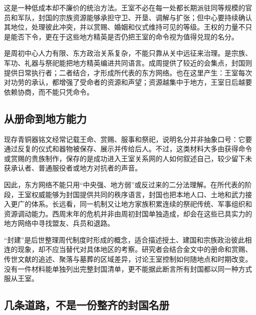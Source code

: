 这是一种低成本却不廉价的统治方法。王室不必在每一处都长期派驻同等规模的官员和军队，封国的宗族资源能够承担守卫、开垦、调解与扩张；但中心要持续确认其地位，处理彼此冲突，并以赏赐、婚姻和仪式维持可见的等级。王权的力量不只是能否下令，更在于这些地方精英是否仍把王室的命令视为值得兑现的名分。

\begin{causalchain}[从东方据点到关系网络]
是周初中心人力有限、东方政治关系复杂，不能只靠从关中远征来治理。是宗族、军功、礼器与祭祀能把地方精英编进共同语言。成周提供了较近的会集点，封国则提供日常执行者；二者结合，才形成所代表的东方网络。也在这里产生：王室每次对功劳的承认，都增强了受命者的资源和声望；资源越集中于地方，王室日后越要依赖协商，而不能只凭命令。
\end{causalchain}

\subsection{从册命到地方能力}

现存青铜器铭文经常记载王命、赏赐、服事和祭祀，说明名分并非抽象口号：它要通过反复的仪式和器物被保存、展示并传给后人。不过，这类材料大多由获得命令或赏赐的贵族制作，保存的是成功进入王室关系网的人如何叙述自己，较少留下未获承认者、普通服役者或地方对抗者的声音。

因此，东方网络不能只用“中央强、地方弱”或反过来的二分法理解。在所代表的阶段，王室权威能够为封国提供共同的秩序语言，封国也把本地人口、土地和武力接入更广的体系。长远看，同一机制又让地方家族积累连续的祭祀传统、军事组织和资源调动能力。西周末年的危机并非由周初封国单独造成，却会在这些已具实力的地方网络中寻找盟友、兵员和退路。

\begin{debate}[“封建”能解释多少]
“封建”是后世整理周代制度时形成的概念，适合描述授土、建国和宗族政治彼此相连的现象，却不应当替代对具体地区的考察。研究者会结合金文中的册命和赏赐、传世文献的追述、聚落与墓葬的区域差异，讨论王室控制如何随地点和时期改变。没有一件材料能单独列出完整封国清单，更不能据此断言所有封国都以同一种方式服从王室。
\end{debate}

\subsection{几条道路，不是一份整齐的封国名册}


